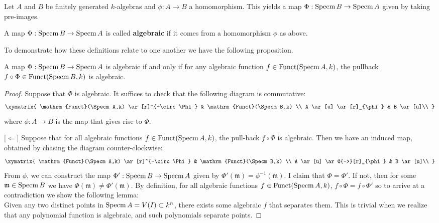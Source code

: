 Let $A$ and $B$ be finitely generated $k$-algebras and $\phi:A\rightarrow B$ a homomorphism.  This yields a map $\Phi:\operatorname{Specm} B\rightarrow \operatorname{Specm} A$ given by taking pre-images.

\begin{definition} A map $\Phi:\operatorname{Specm} B\rightarrow \operatorname{Specm} A$ is called {\bf algebraic} if it comes from a homomorphism $\phi$ as above.\end{definition}

To demonstrate how these definitions relate to one another we have the following proposition.

\begin{proposition} A map $\Phi:\operatorname{Specm} B\rightarrow \operatorname{Specm} A$ is algebraic if and only if for any algebraic function $f\in \mathrm{Funct}(\operatorname{Specm} A,k)$, the pullback $f\circ \Phi\in \mathrm{Funct}(\operatorname{Specm} B,k)$ is algebraic.\end{proposition}

\begin{proof}
Suppose that $\Phi$ is algebraic.  It suffices to check that the following diagram is commutative:
\[ 
\xymatrix{
\mathrm{Funct}(\Specm A,k) \ar[r]^{-\circ\Phi} & \mathrm{Funct}(\Specm B,k) \\
A \ar[u] \ar[r]_{\phi} & B \ar[u]\\
}
\]
where $\phi:A\rightarrow B$ is the map that gives rise to $\Phi$.

[$\Leftarrow$] Suppose that for all algebraic functions $f\in \mathrm{Funct}(\operatorname{Specm} A,k)$, the pull-back $f\circ\Phi$ is algebraic.  Then we have an induced map, obtained by chasing the diagram counter-clockwise:
$$
\xymatrix{
\mathrm{Funct}(\Specm A,k) \ar[r]^{-\circ\Phi} & \mathrm{Funct}(\Specm B,k) \\
A \ar[u] \ar@{-->}[r]_{\phi} & B \ar[u]\\
}
$$
From $\phi$, we can construct the map $\Phi':\operatorname{Specm} B \rightarrow \operatorname{Specm} A$ given by $\Phi'(\mathfrak{m})=\phi^{-1}(\mathfrak{m})$.  I claim that $\Phi=\Phi'$.  If not, then for some $\mathfrak{m}\in \operatorname{Specm} B$ we have $\Phi(\mathfrak{m})\neq \Phi'(\mathfrak{m})$.  By definition, for all algebraic functions $f\in \mathrm{Funct}(\operatorname{Specm} A,k)$, $f\circ\Phi=f\circ\Phi'$ so to arrive at a contradiction we show the following lemma:\\
Given any two distinct points in $\operatorname{Specm} A=V(I)\subset k^n$, there exists some
algebraic $f$ that separates them.  This is trivial when we realize that any
polynomial function is algebraic, and such polynomials separate points.
\end{proof}

